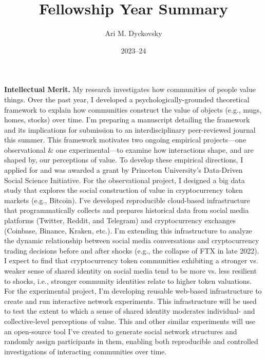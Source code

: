 \documentclass{article}
\title{Fellowship Year Summary}
\date{2023--24}
\author{Ari M. Dyckovsky}
\begin{document}
\maketitle
\thispagestyle{empty}

\textbf{Intellectual Merit.} My research investigates how communities of people value things. Over the past year, I developed a psychologically-grounded theoretical framework to explain how communities construct the value of objects (e.g., mugs, homes, stocks) over time. I'm preparing a manuscript detailing the framework and its implications for submission to an interdisciplinary peer-reviewed journal this summer. This framework motivates two ongoing empirical projects---one observational \& one experimental---to examine how interactions shape, and are shaped by, our perceptions of value. To develop these empirical directions, I applied for and was awarded a grant by Princeton University's Data-Driven Social Science Initiative. For the observational project, I designed a big data study that explores the social construction of value in cryptocurrency token markets (e.g., Bitcoin). I've developed reproducible cloud-based infrastructure that programmatically collects and prepares historical data from social media platforms (Twitter, Reddit, and Telegram) and cryptocurrency exchanges (Coinbase, Binance, Kraken, etc.). I'm extending this infrastructure to analyze the dynamic relationship between social media conversations and cryptocurrency trading decisions before and after shocks (e.g., the collapse of FTX in late 2022). I expect to find that cryptocurrency token communities exhibiting a stronger vs. weaker sense of shared identity on social media tend to be more vs. less resilient to shocks, i.e., stronger community identities relate to higher token valuations. For the experimental project, I'm developing reusable web-based infrastructure to create and run interactive network experiments. This infrastructure will be used to test the extent to which a sense of shared identity moderates individual- and collective-level perceptions of value. This and other similar experiments will use an open-source tool I've created to generate social network structures and randomly assign participants in them, enabling both reproducible and controlled investigations of interacting communities over time. 
\end{document}
